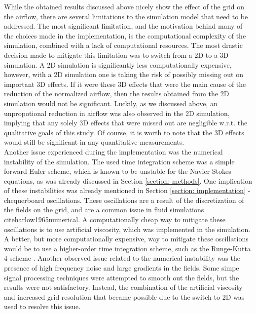 While the obtained results discussed above nicely show the effect of the grid on the airflow, there are several limitations to the simulation model that need to be addressed. The most significant limitation, and the motivation behind many of the choices made in the implementation, is the computational complexity of the simulation, combined with a lack of computational resources. The most drastic decision made to mitigate this limitation was to switch from a 2D to a 3D simulation. A 2D simulation is significantly less computationally expensive, however, with a 2D simulation one is taking the risk of possibly missing out on important 3D effects. If it were these 3D effects that were the main cause of the reduction of the normalized airflow, then the results obtained from the 2D simulation would not be significant. Luckily, as we discussed above, an unpropotional reduction in airflow was also observed in the 2D simulation, implying that any solely 3D effects that were missed out are negligible w.r.t. the qualitative goals of this study. Of course, it is worth to note that the 3D effects would still be significant in any quantitative measurements.  \\

Another issue experienced during the implementation was the numerical instability of the simulation. The used time integration scheme was a simple forward Euler scheme, which is known to be unstable for the Navier-Stokes equations, as was already discussed in Section \ref{section: methods}. One implication of these instabilities was already mentioned in Section \ref{section: implementation} - chequerboard oscillations. These oscillations are a result of the discretization of the fields on the grid, and are a common issue in fluid simulations cite{harlow1965numerical}. A computationally cheap way to mitigate these oscillations is to use artificial viscosity, which was implemented in the simulation. A better, but more computationally expensive, way to mitigate these oscillations would be to use a higher-order time integration scheme, such as the Runge-Kutta 4 scheme \cite{RungeKutta}. Another observed issue related to the numerical instability was the presence of high frequency noise and large gradients in the fields. Some simpe signal processing techniques were attempted to smooth out the fields, but the results were not satisfactory. Instead, the combination of the artificial viscosity and increased grid resolution that became possible due to the switch to 2D was used to resolve this issue. \\

